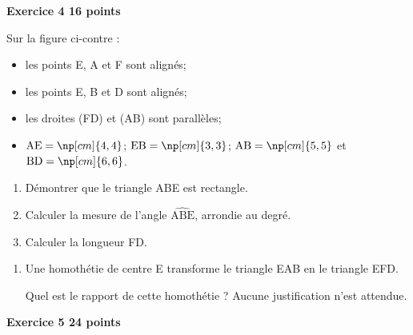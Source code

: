\documentclass[11pt]{article}
\begin{document}
\bigskip

\textbf{Exercice 4 \hfill 16 points}

\medskip

\begin{minipage}[b]{0.65\linewidth}
Sur la figure ci-contre :

\begin{itemize}[label=\textbullet]
\item les points E, A et F sont alignés;
\item les points E, B et D sont alignés;
\item les droites (FD) et (AB) sont parallèles;
\item $\mathrm{AE}=\np[cm]{4,4}$; $\mathrm{EB} =\np[cm]{3,3}$; $\mathrm{AB} = \np[cm]{5,5}$ et $\mathrm{BD} = \np[cm]{6,6}$.
\end{itemize}

\vspace{1cm}

\begin{enumerate}
\item Démontrer que le triangle ABE est rectangle.
\item Calculer la mesure de l'angle $\widehat{\mathrm{ABE}}$, arrondie au degré.
\item Calculer la longueur FD.
\end{enumerate}

\end{minipage}
\hfill
{}

\begin{enumerate}[start=4]
\item Une homothétie de centre E transforme le triangle EAB en le triangle EFD.

Quel est le rapport de cette homothétie ? Aucune justification n'est attendue.
\end{enumerate}

\newpage

\textbf{Exercice 5 \hfill 24 points}

\medskip
\end{document}
